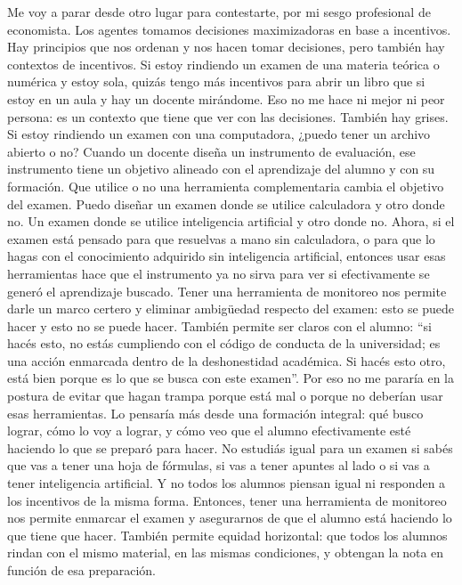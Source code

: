 \begin{description}[leftmargin=0cm, labelsep=0.5cm, style=nextline]
\item[\textbf{Entrevistada:}] Me voy a parar desde otro lugar para contestarte, por mi sesgo profesional de economista. Los agentes tomamos decisiones maximizadoras en base a incentivos. Hay principios que nos ordenan y nos hacen tomar decisiones, pero también hay contextos de incentivos.
Si estoy rindiendo un examen de una materia teórica o numérica y estoy sola, quizás tengo más incentivos para abrir un libro que si estoy en un aula y hay un docente mirándome. Eso no me hace ni mejor ni peor persona: es un contexto que tiene que ver con las decisiones.
También hay grises. Si estoy rindiendo un examen con una computadora, ¿puedo tener un archivo abierto o no? Cuando un docente diseña un instrumento de evaluación, ese instrumento tiene un objetivo alineado con el aprendizaje del alumno y con su formación. Que utilice o no una herramienta complementaria cambia el objetivo del examen.
Puedo diseñar un examen donde se utilice calculadora y otro donde no. Un examen donde se utilice inteligencia artificial y otro donde no. Ahora, si el examen está pensado para que resuelvas a mano sin calculadora, o para que lo hagas con el conocimiento adquirido sin inteligencia artificial, entonces usar esas herramientas hace que el instrumento ya no sirva para ver si efectivamente se generó el aprendizaje buscado.
Tener una herramienta de monitoreo nos permite darle un marco certero y eliminar ambigüedad respecto del examen: esto se puede hacer y esto no se puede hacer. También permite ser claros con el alumno: ``si hacés esto, no estás cumpliendo con el código de conducta de la universidad; es una acción enmarcada dentro de la deshonestidad académica. Si hacés esto otro, está bien porque es lo que se busca con este examen''.
Por eso no me pararía en la postura de evitar que hagan trampa porque está mal o porque no deberían usar esas herramientas. Lo pensaría más desde una formación integral: qué busco lograr, cómo lo voy a lograr, y cómo veo que el alumno efectivamente esté haciendo lo que se preparó para hacer.
No estudiás igual para un examen si sabés que vas a tener una hoja de fórmulas, si vas a tener apuntes al lado o si vas a tener inteligencia artificial. Y no todos los alumnos piensan igual ni responden a los incentivos de la misma forma.
Entonces, tener una herramienta de monitoreo nos permite enmarcar el examen y asegurarnos de que el alumno está haciendo lo que tiene que hacer. También permite equidad horizontal: que todos los alumnos rindan con el mismo material, en las mismas condiciones, y obtengan la nota en función de esa preparación.

\end{description}
